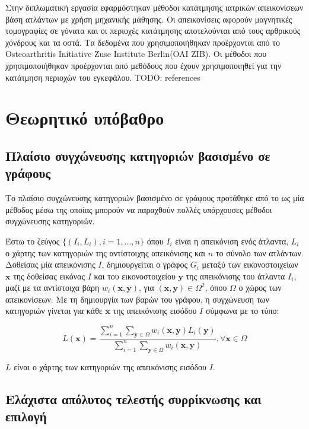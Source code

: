 \documentclass[a4paper,12pt]{article}
\begin{document}
Στην διπλωματική εργασία εφαρμόστηκαν μέθοδοι κατάτμησης ιατρικών απεικονίσεων
βάση ατλάντων με χρήση μηχανικής μάθησης. Οι απεικονίσεις αφορούν μαγνητικές
τομογραφίες σε γόνατα και οι περιοχές κατάτμησης αποτελούνται από τους αρθρικούς
χόνδρους και τα οστά. Τα δεδομένα που χρησιμοποιήθηκαν προέρχονται από το
Osteoarthritis Initiative Zuse Institute Berlin(OAI ZIB). Οι μέθοδοι που
χρησιμοποιήθηκαν προέρχονται από μεθόδους που έχουν χρησιμοποιηθεί για την
κατάτμηση περιοχών του εγκεφάλου.
TODO: references


\section{Θεωρητικό υπόβαθρο}

\subsection{Πλαίσιο συγχώνευσης κατηγοριών βασισμένο σε γράφους}

Το πλαίσιο συγχώνευσης κατηγοριών βασισμένο σε γράφους προτάθηκε από
το \cite{Zhang:1} ως μία μέθοδος μέσω της οποίας μπορούν να παραχθούν πολλές
υπάρχουσες μέθοδοι συγχώνευσης κατηγοριών.

Έστω το ζεύγος $\{(I_i,L_i),i=1,...,n\}$ όπου $I_i$ είναι η απεικόνιση ενός
άτλαντα, $L_i$ ο χάρτης των κατηγοριών της αντίστοιχης απεικόνισης και $n$ το
σύνολο των ατλάντων. Δοθείσας μία απεικόνισης $I$, δημιουργείται ο γράφος $G_i$
μεταξύ των εικονοστοιχείων $\bm{x}$ της δοθείσας εικόνας $I$ και του
εικονοστοιχείου $\bm{y}$ της απεικόνισης του άτλαντα $I_i$, μαζί με τα
αντίστοιχα βάρη $w_i(\bm{x},\bm{y})$, για $(\bm{x},\bm{y})\in\Omega^2$, όπου
$\Omega$ ο χώρος των απεικονίσεων. Με τη δημιουργία των βαρών του γράφου, η
συγχώνευση των κατηγοριών γίνεται για κάθε $\bm{x}$ της απεικόνισης εισόδου $I$
σύμφωνα με το τύπο:

\begin{equation}
    L(\bm{x})=\frac{ \sum_{i=1}^{n}  \sum_{\bm{y}\in\Omega}
                     w_i(\bm{x},\bm{y})L_i(\bm{y})}
    { \sum_{i=1}^{n}  \sum_{\bm{y}\in\Omega} w_i(\bm{x},\bm{y}) }
    , \forall \bm{x}\in\Omega
\end{equation}

$L$ είναι ο χάρτης των κατηγοριών της απεικόνισης εισόδου $I$.

\subsection{Ελάχιστα απόλυτος τελεστής συρρίκνωσης και επιλογή}
\end{document}
